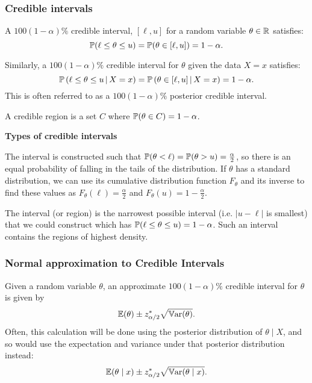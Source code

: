 \documentclass[10pt, a4paper]{article}
\begin{document}
\subsubsection{Credible intervals}
\begin{definition}
    A $100(1 - \alpha)\%$ credible interval,
    $[\ell, u]$ for a random variable $\theta \in \R$ satisfies:
    \[
    \P(\ell \leq \theta \leq u) = \P(\theta \in [\ell, u]) = 1 - \alpha.
    \]

    Similarly,
    a $100(1 - \alpha)\%$ credible interval for $\theta$ given the data $X = x$ satisfies:
    \[
    \cP{\ell \leq \theta \leq u}{X = x} = \cP{\theta \in [\ell, u]}{X = x} = 1 - \alpha.
    \]
    This is often referred to as a $100(1 - \alpha)\%$ posterior credible interval.
\end{definition}

A credible region is a set $C$ where $\P(\theta \in C) = 1 - \alpha$.

\textbf{Types of credible intervals}
\begin{definition}
    The interval is constructed such that $\P(\theta < \ell) = \P(\theta > u) = \frac{\alpha}{2}$,
    so there is an equal probability of falling in the tails of the distribution.
    If $\theta$ has a standard distribution,
    we can use its cumulative distribution function $F_{\theta}$ and its inverse to find these values as $F_{\theta}(\ell) = \frac{\alpha}{2}$ and $F_{\theta}(u) = 1 - \frac{\alpha}{2}$.
\end{definition}
\begin{definition}
    The interval
    (or region)
    is the narrowest possible interval
    (i.e. $|u - \ell|$ is smallest)
    that we could construct which has $\P(\ell \leq \theta \leq u) = 1 - \alpha$.
    Such an interval contains the regions of highest density.
\end{definition}

\subsubsection{Normal approximation to Credible Intervals}
\begin{definition}
    Given a random variable $\theta$,
    an approximate $100(1 - \alpha)\%$ credible interval for $\theta$ is given by
    \[
    \E(\theta) \pm z_{\alpha / 2}^{*}\sqrt{\Var(\theta)}.
    \]
    Often,
    this calculation will be done using the posterior distribution of $\theta\mid X$,
    and so would use the expectation and variance under that posterior distribution instead:
    \[
    \E(\theta\mid x) \pm z_{\alpha / 2}^{*}\sqrt{\Var(\theta\mid x)}.
    \]
\end{definition}
\end{document}
